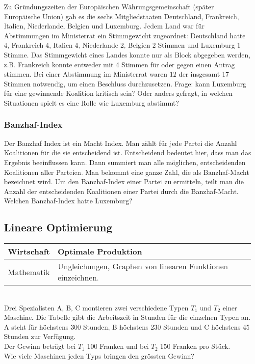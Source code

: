 \documentclass[11pt, twocolumn, a4paper]{scrartcl}
\begin{document}
Zu Gründungszeiten der Europäischen Währungsgemeinschaft (später Europäische Union) gab es die sechs Mitgliedstaaten Deutschland, Frankreich, Italien, Niederlande, Belgien und Luxemburg. Jedem Land war für Abstimmungen im Ministerrat ein Stimmgewicht zugeordnet: Deutschland hatte 4, Frankreich 4, Italien 4, Niederlande 2, Belgien 2 Stimmen und Luxemburg 1 Stimme. Das Stimmgewicht eines Landes konnte nur als Block abgegeben werden, z.B. Frankreich konnte entweder mit 4 Stimmen für oder gegen einen Antrag stimmen. Bei einer Abstimmung im Ministerrat waren 12 der insgesamt 17 Stimmen notwendig, um einen Beschluss durchzusetzen. Frage: kann Luxemburg für eine gewinnende Koalition kritisch sein? Oder anders gefragt, in welchen Situationen spielt es eine Rolle wie Luxemburg abstimmt?
\subsubsection{Banzhaf-Index}
Der Banzhaf Index ist ein Macht Index. Man zählt für jede Partei die Anzahl Koalitionen für die sie entscheidend ist. Entscheidend bedeutet hier, dass man das Ergebnis beeinflussen kann. Dann summiert man alle möglichen, entscheidenden Koalitionen aller Parteien. Man bekommt eine ganze Zahl, die als Banzhaf-Macht bezeichnet wird. Um den Banzhaf-Index einer Partei zu ermitteln, teilt man die Anzahl der entscheidenden Koalitionen einer Partei durch die Banzhaf-Macht. Welchen Banzhaf-Index hatte Luxemburg?

\subsection{Lineare Optimierung}



\begin{tabular}{l l}
\toprule
Wirtschaft & Optimale Produktion \\
\midrule
Mathematik& Ungleichungen, Graphen von linearen Funktionen einzeichnen. \\

\bottomrule
\end{tabular}\\

Drei Spezialisten A, B, C montieren zwei verschiedene Typen $T_1$ und $T_2$ einer Maschine. Die Tabelle gibt die Arbeitszeit in Stunden für die einzelnen Typen an. A steht für höchstens 300 Stunden, B höchstens 230 Stunden und C höchstens 45 Stunden zur Verfügung.\\
Der Gewinn beträgt bei $T_1$ 100 Franken und bei $T_2$ 150 Franken pro Stück.\\
Wie viele Maschinen jeden Typs bringen den grössten Gewinn?\\
\end{document}

